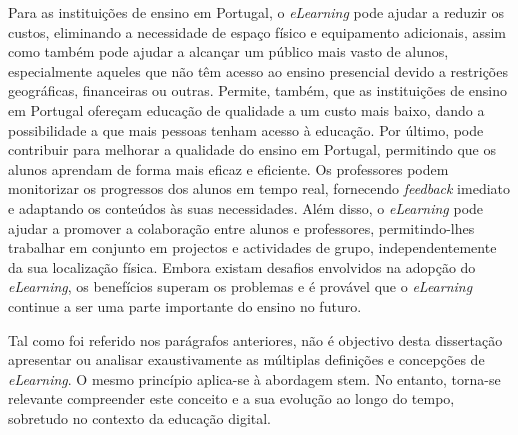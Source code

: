 Para as instituições de ensino em Portugal, o \textit{eLearning} pode ajudar a reduzir os custos, eliminando a necessidade de espaço físico e equipamento adicionais, assim como também pode ajudar a alcançar um público mais vasto de alunos, especialmente aqueles que não têm acesso ao ensino presencial devido a restrições geográficas, financeiras ou outras. Permite, também, que as instituições de ensino em Portugal ofereçam educação de qualidade a um custo mais baixo, dando a possibilidade a que mais pessoas tenham acesso à educação. Por último, pode contribuir para melhorar a qualidade do ensino em Portugal, permitindo que os alunos aprendam de forma mais eficaz e eficiente. Os professores podem monitorizar os progressos dos alunos em tempo real, fornecendo \textit{feedback} imediato e adaptando os conteúdos às suas necessidades. Além disso, o \textit{eLearning} pode ajudar a promover a colaboração entre alunos e professores, permitindo-lhes trabalhar em conjunto em projectos e actividades de grupo, independentemente da sua localização física. Embora existam desafios envolvidos na adopção do \textit{eLearning}, os benefícios superam os problemas e é provável que o \textit{eLearning} continue a ser uma parte importante do ensino no futuro.

Tal como foi referido nos parágrafos anteriores, não é objectivo desta dissertação apresentar ou analisar exaustivamente as múltiplas definições e concepções de \textit{eLearning}. O mesmo princípio aplica-se à abordagem \acrshort{stem}. No entanto, torna-se relevante compreender este conceito e a sua evolução ao longo do tempo, sobretudo no contexto da educação digital.

